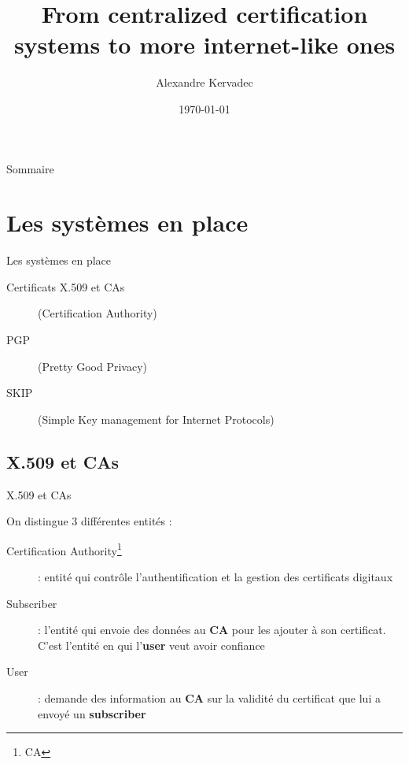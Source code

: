 \documentclass{bredelebeamer}
\title[Certification systems]{From centralized certification systems to more internet-like ones}
\subtitle{}
\author{Alexandre Kervadec\inst{1}}
\institute[Université de Bordeaux]
{
  \inst{1}%
  Master 2 Informatique RSM
  }
\date{\today}
\begin{document}
\begin{frame}
  \titlepage
\end{frame}





\begin{frame}{Sommaire}
  \tableofcontents
\end{frame}




\section{Les systèmes en place}

\begin{frame}{Les systèmes en place}

\begin{description}
	\item [Certificats X.509 et CAs] (Certification Authority)
	\item [PGP] (Pretty Good Privacy)
	\item [SKIP] (Simple Key management for Internet Protocols)
\end{description}

\end{frame}

\subsection{X.509 et CAs}

\begin{frame}{X.509 et CAs}

	On distingue 3 différentes entités :
	\begin{description}
		\item [Certification Authority\footnote{CA}] : entité qui contrôle l'authentification et la gestion des certificats digitaux
		\item [Subscriber] : l'entité qui envoie des données au \textbf{CA} pour les ajouter à son certificat. C'est l'entité en qui l'\textbf{user} veut avoir confiance
		\item [User] : demande des information au \textbf{CA} sur la validité du certificat que lui a envoyé un \textbf{subscriber}
	\end{description}

\end{frame}
\end{document}
